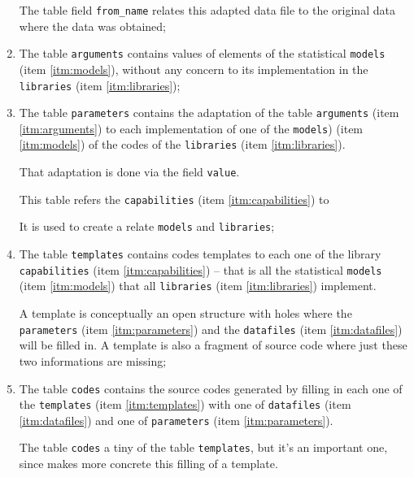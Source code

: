 \documentclass[a4paper,10pt]{article}
\begin{document}
\begin{enumerate}
        The table field {\tt from\_name} relates this adapted data
        file to the original data where the data was obtained;

    \item \label{itm:arguments}
        The table {\tt arguments} contains values of elements
        of the statistical {\tt models} (item \ref{itm:models}),
        without any concern to its implementation in the
        {\tt libraries} (item \ref{itm:libraries});

    \item \label{itm:parameters}
        The table {\tt parameters} contains the adaptation of the
        table {\tt arguments} (item \ref{itm:arguments}) to each
        implementation of one of the {\tt models}) (item
        \ref{itm:models}) of the codes of the  {\tt libraries}
        (item \ref{itm:libraries}).

        That adaptation is done via the field {\tt value}.

        This table refers the {\tt capabilities} (item
        \ref{itm:capabilities}) to

        It is used to create a relate {\tt models} and
        {\tt libraries};

    \item \label{itm:templates}
        The table {\tt templates} contains codes templates to
        each one of the library {\tt capabilities}
        (item \ref{itm:capabilities}) -- that is all the
        statistical {\tt models} (item \ref{itm:models}) that all
        {\tt libraries} (item \ref{itm:libraries}) implement.

        A template is conceptually an open structure with holes
        where the {\tt parameters} (item \ref{itm:parameters})
        and the {\tt datafiles} (item \ref{itm:datafiles}) will
        be filled in. A template is also a fragment of source
        code where just these two informations are missing;

    \item \label{itm:codes}
        The table {\tt codes} contains the source codes generated
        by filling in each one of the {\tt templates} (item
        \ref{itm:templates}) with one of {\tt datafiles} (item
        \ref{itm:datafiles}) and one of {\tt parameters}
        (item \ref{itm:parameters}).

        The table {\tt codes} a tiny of the table {\tt templates},
        but it's an important one, since makes more concrete this
        filling of a template.


\end{enumerate}
\end{document}
